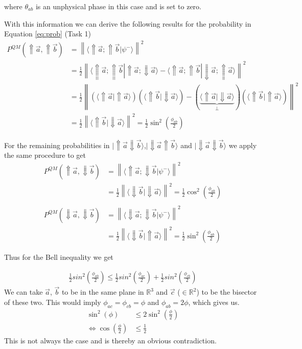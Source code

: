 \documentclass[a4paper]{article}
\begin{document}
where $\theta_{ab}$ is an unphysical phase in this case and is set to zero.

With this information we can derive the following results for the
probability in Equation \ref{eq:prob} (Task 1)
\begin{align}
    P^{QM}(\Uparrow \vec{a}, \Uparrow \vec{b}) &= \left\|\langle\Uparrow \vec{a}; \Uparrow
    \vec{b}|\psi ^-\rangle \right\|^2 \\
    &=\frac{1}{2} \left\|\langle\Uparrow \vec{a}; \Uparrow \vec{b}|\Uparrow
    \vec{a}; \Downarrow \vec{a}\rangle - \langle \Uparrow \vec{a}; \Uparrow
    \vec{b}| \Downarrow \vec{a}; \Uparrow \vec{a}\rangle\right\|^2 \\
    &= \frac{1}{2}\left\|(\langle\Uparrow \vec{a}|\Uparrow\vec{a}\rangle)
    (\langle\Uparrow \vec{b}| \Downarrow \vec{a}\rangle) - (\underbrace{\langle\Uparrow
    \vec{a}| \Downarrow \vec{a}\rangle}_{\bot})(\langle\Uparrow \vec{b}|
    \Uparrow\vec{a}\rangle)\right\|^2 \\
    &=\frac{1}{2}\left\|\langle\Uparrow\vec{b}|\Downarrow\vec{a}\rangle\right\|^2
    =\frac{1}{2}\sin^2(\frac{\phi_{ab}}{2})
\end{align}

For the remaining probabilities in $|\Uparrow \vec{a}\Downarrow \vec{b}\rangle$,$|\Downarrow
\vec{a}\Uparrow\vec{b}\rangle$ and $|\Downarrow\vec{a}\Downarrow\vec{b} \rangle$
we apply the same procedure to get
\begin{align}
    P^{QM}(\Uparrow \vec{a}, \Downarrow \vec{b}) &= \left\|\langle\Uparrow
    \vec{a}; \Downarrow \vec{b}|\psi^- \rangle\right\|^2 \\
    &=\frac{1}{2}\left\|\langle\Downarrow \vec{b}|\Downarrow
    \vec{a}\rangle\right\|^2 = \frac{1}{2}\cos^2(\frac{\phi_{ab}}{2})\\
    \\
    P^{QM}(\Downarrow \vec{a}, \Downarrow \vec{b}) &= \left\|\langle\Downarrow
    \vec{a}; \Downarrow \vec{b}|\psi^- \rangle\right\|^2 \\
    &=\frac{1}{2}\left\|\langle\Downarrow \vec{b}|\Uparrow
    \vec{a}\rangle\right\|^2 = \frac{1}{2}\sin^2(\frac{\phi_{ab}}{2})
\end{align}

Thus for the Bell inequality we get

\begin{align}
    \frac{1}{2}sin^2(\frac{\phi_{ab}}{2}) \leq
    \frac{1}{2}sin^2(\frac{\phi_{ac}}{2})+
    \frac{1}{2}sin^2(\frac{\phi_{cb}}{2})
\end{align}
We can take $\vec{a}$, $\vec{b}$ to be in the same plane in $\mathbb{R}^3$ and
$\vec{c}$ ($\in \mathbb{R}^2$) to be the bisector of these two. This would imply
$\phi_{ac}=\phi_{cb}= \phi$ and $\phi_{ab}=2\phi$, which gives us.
\begin{align}
    \sin^2(\phi) &\leq 2\sin^2(\frac{\phi}{2})\\
    \Leftrightarrow \cos(\frac{\phi}{2}) &\leq \frac{1}{2}
\end{align}
This is not always the case and is thereby an obvious contradiction.
\end{document}
